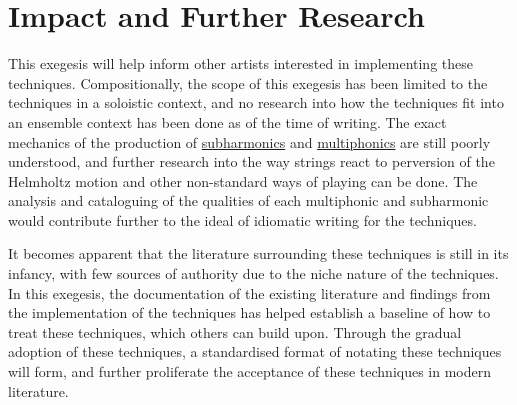 \section{Impact and Further Research}
This exegesis will help inform other artists interested in implementing these techniques. 
Compositionally, the scope of this exegesis has been limited to the techniques in a soloistic context, and no research into how the techniques fit into an ensemble context has been done as of the time of writing.
The exact mechanics of the production of \hyperref[sec:subharmonics]{subharmonics} and \hyperref[sec:multiphonics]{multiphonics} are still poorly understood, and further research into the way strings react to perversion of the Helmholtz motion and other non-standard ways of playing can be done.
The analysis and cataloguing of the qualities of each multiphonic and subharmonic would contribute further to the ideal of idiomatic writing for the techniques.


It becomes apparent that the literature surrounding these techniques is still in its infancy, with few sources of authority due to the niche nature of the techniques.
In this exegesis, the documentation of the existing literature and findings from the implementation of the techniques has helped establish a baseline of how to treat these techniques, which others can build upon.
Through the gradual adoption of these techniques, a standardised format of notating these techniques will form, and further proliferate the acceptance of these techniques in modern literature.

